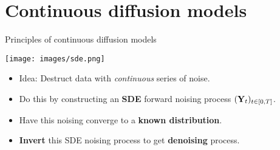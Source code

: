\section{Continuous diffusion models}

\begin{frame}{Principles of continuous diffusion models}
\begin{center}
    \texttt{[image: images/sde.png]}
\end{center}
\vspace{-0.5em}
\begin{itemize} [triangle]
    \item Idea: Destruct data with \textit{continuous} series of noise.
    \item Do this by constructing an \textbf{SDE} forward noising process $(\mathbf{Y}_t)_{t \in \left[0,T\right]}$.
    \item Have this noising converge to a \textbf{known distribution}.
    \item \textbf{Invert} this SDE noising process to get \textbf{denoising} process.
\end{itemize}
%
\end{frame}


